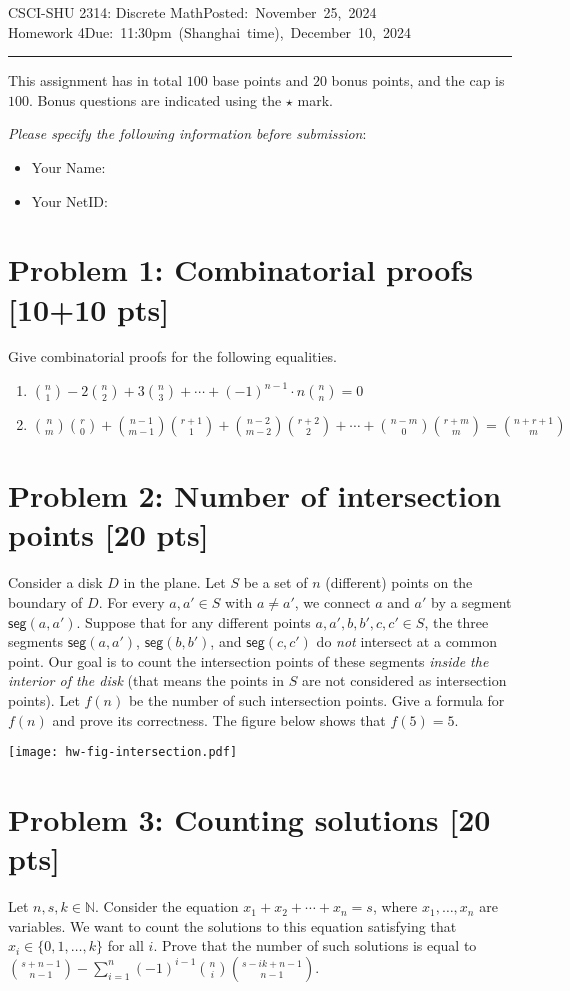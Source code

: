 \documentclass[11pt,twoside]{article}
\newcommand{\homework}[1]{
   \pagestyle{myheadings}
   \thispagestyle{plain}
   \newpage
   \setcounter{page}{1}
   \noindent
   \classname \hfill \mbox{\updatedday} \\
   \instname \hfill \mbox{\duedate}
   \rule{6.5in}{0.5mm}
   \vspace*{-0.1 in}
}
\newcommand{\problem}[1]{\section*{Problem #1}}
\def\classname{CSCI-SHU 2314: Discrete Math}
\def\updatedday{Posted: November 25, 2024}
\def\duedate{Due: 11:30pm (Shanghai time), December 10, 2024}
\def\instname{Homework 4}
\begin{document}
\homework{1}

This assignment has in total $100$ base points and $20$ bonus points, and the cap is $100$.
Bonus questions are indicated using the $\star$ mark.

\textit{Please specify the following information before submission}:
\begin{itemize}
    \item Your Name: %
    \item Your NetID: %
\end{itemize}



\problem{1: Combinatorial proofs [10+10 pts]} 

Give combinatorial proofs for the following equalities.

\begin{enumerate}

    \item $\binom{n}{1}-2\binom{n}{2}+3\binom{n}{3}+\cdots+(-1)^{n-1}\cdot n \binom{n}{n} = 0$
    \item $\binom{n}{m} \binom{r}{0} + \binom{n-1}{m-1} \binom{r+1}{1} + \binom{n-2}{m-2} \binom{r+2}{2} +\cdots+ \binom{n-m}{0} \binom{r+m}{m} = \binom{n+r+1}{m}$
    
\end{enumerate}

\problem{2: Number of intersection points [20 pts]}
Consider a disk $D$ in the plane.
Let $S$ be a set of $n$ (different) points on the boundary of $D$.
For every $a,a' \in S$ with $a \neq a'$, we connect $a$ and $a'$ by a segment $\mathsf{seg}(a,a')$.
Suppose that for any different points $a,a',b,b',c,c' \in S$, the three segments $\mathsf{seg}(a,a')$, $\mathsf{seg}(b,b')$, and $\mathsf{seg}(c,c')$ do \textit{not} intersect at a common point.
Our goal is to count the intersection points of these segments \textit{inside the interior of the disk} (that means the points in $S$ are not considered as intersection points).
Let $f(n)$ be the number of such intersection points.
Give a formula for $f(n)$ and prove its correctness.
The figure below shows that $f(5) = 5$.

\begin{center}
    \texttt{[image: hw-fig-intersection.pdf]}
\end{center}

\problem{3: Counting solutions [20 pts]}
Let $n,s,k \in \mathbb{N}$.
Consider the equation $x_1+x_2+\cdots+x_n = s$, where $x_1,\dots,x_n$ are variables.
We want to count the solutions to this equation satisfying that $x_i \in \{0,1,\dots,k\}$ for all $i$.
Prove that the number of such solutions is equal to $\binom{s+n-1}{n-1} - \sum_{i=1}^n (-1)^{i-1} \binom{n}{i} \binom{s-ik+n-1}{n-1}$.
\end{document}
